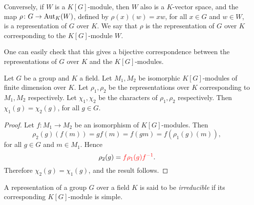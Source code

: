 Conversely, if $W$ is a $K[G]$-module, then $W$ also is a $K$-vector space, and the map $\rho\colon G\rightarrow\operatorname{Aut}_K(W)$, 
defined by $\rho(x)(w)=xw$, for all $x\in G$ and $w\in W$, is a representation of $G$ over $K$. We say that $\rho$ is the representation of $G$ over $K$ corresponding to the $K[G]$-module $W$.

One can easily check that this gives a bijective correspondence between the representations of $G$ over $K$ and the $K[G]$-modules.

\begin{lemma}\label{equivrep}
Let $G$ be a group and $K$ a field. Let $M_1,M_2$ be isomorphic $K[G]$-modules of finite dimension over $K$. Let $\rho_1,\rho_2$ be the representations over $K$ corresponding to $M_1,M_2$ respectively. Let $\chi_1,\chi_2$ be the characters of $\rho_1,\rho_2$ respectively. Then $\chi_1(g)=\chi_2(g)$, for all $g\in G$.
\end{lemma}

\begin{proof}
    Let $f: M_1\rightarrow M_2$ be an isomorphism of $K[G]$-modules. Then
    \[ \rho_2(g)(f(m))=gf(m)=f(gm)=f(\rho_1(g)(m)),\]
    for all $g\in G$ and $m\in M_1$. Hence
    \[ \rho_2(g)=\textcolor{red}{f \rho_1(g) f^{-1}}.\]
    Therefore $\chi_2(g)=\chi_1(g)$, and the result follows.
\end{proof}
 
\begin{definition}
A representation of a group $G$ over a field $K$ is said to be {\em irreducible} if its corresponding $K[G]$-module is simple.
\end{definition}



